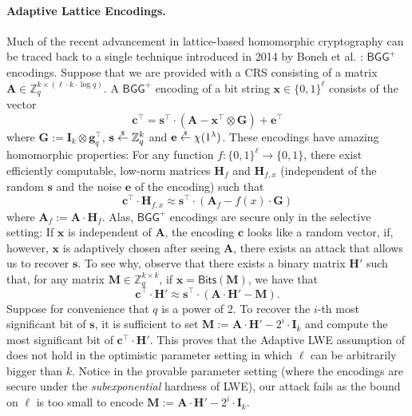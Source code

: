 \documentclass{article}
\newcommand{\getsr}{\overset{\raisebox{-1pt}{$\scriptscriptstyle \$$}}{\gets}}
\newcommand{\sample}{\getsr}
\newcommand{\Z}{\mathbb{Z}}
\renewcommand{\sec}{\ensuremath{\lambda}}
\newcommand{\id}{\ensuremath{\mathbf{I}}}
\newcommand\bbbone{1}
\begin{document}
\paragraph{Adaptive Lattice Encodings.} Much of the recent advancement in lattice-based homomorphic cryptography can be traced back to a single technique introduced in 2014 by Boneh et al. \cite{EC:BGGHNS14}: $\mathsf{BGG^+}$ encodings. Suppose that we are provided with a CRS consisting of a matrix $\mathbf{A}\in\Z_q^{k\times (\ell\cdot k\cdot \log q)}$. A $\mathsf{BGG^+}$ encoding of a bit string $\mathbf{x}\in\{0, 1\}^\ell$ consists of the vector
\[\mathbf{c}^\intercal=\mathbf{s}^\intercal \cdot(\mathbf{A}-\mathbf{x}^\intercal\otimes \mathbf{G})+\mathbf{e}^\intercal\]
where $\mathbf{G}:=\id_k\otimes \mathbf{g}_q^\intercal$, $\mathbf{s}\sample\Z_q^k$ and $\mathbf{e}\sample\chi(\bbbone^\sec)$. These encodings have amazing homomorphic properties: For any function $f:\{0, 1\}^\ell\rightarrow\{0, 1\}$, there exist efficiently computable, low-norm matrices $\mathbf{H}_f$ and $\mathbf{H}_{f, x}$ (independent of the random $\mathbf{s}$ and the noise $\mathbf{e}$ of the encoding) such that
\[\mathbf{c}^\intercal\cdot \mathbf{H}_{f, x}\approx \mathbf{s}^\intercal \cdot (\mathbf{A}_f-f(x)\cdot \mathbf{G})\]
where $\mathbf{A}_f:=\mathbf{A}\cdot \mathbf{H}_f$. Alas, $\mathsf{BGG^+}$ encodings are secure only in the selective setting: If $\mathbf{x}$ is independent of $\mathbf{A}$, the encoding $\mathbf{c}$ looks like a random vector, if, however, $\mathbf{x}$ is adaptively chosen after seeing $\mathbf{A}$, there exists an attack that allows us to recover $\mathbf{s}$. To see why, observe that there exists a binary matrix $\mathbf{H}'$ such that, for any matrix $\mathbf{M}\in\Z_q^{k\times k}$, if $\mathbf{x}=\mathsf{Bits}(\mathbf{M})$, we have that
\[\mathbf{c}^\intercal\cdot \mathbf{H}'\approx \mathbf{s}^\intercal \cdot (\mathbf{A}\cdot \mathbf{H}'-\mathbf{M}).\]
Suppose for convenience that $q$ is a power of 2. To recover the $i$-th most significant bit of $\mathbf{s}$, it is sufficient to set $\mathbf{M}:=\mathbf{A}\cdot \mathbf{H}'- 2^i\cdot \id_k$ and compute the most significant bit of $\mathbf{c}^\intercal\cdot \mathbf{H}'$. This proves that the Adaptive LWE assumption of \cite{FOCS:QuaWeeWic18} does not hold in the optimistic parameter setting in which $\ell$ can be arbitrarily bigger than $k$. Notice in the provable parameter setting (where the encodings are secure under the \emph{subexponential} hardness of LWE), our attack fails as the bound on $\ell$ is too small to encode $\mathbf{M}:=\mathbf{A}\cdot \mathbf{H}'- 2^i\cdot \id_k$.
\end{document}
